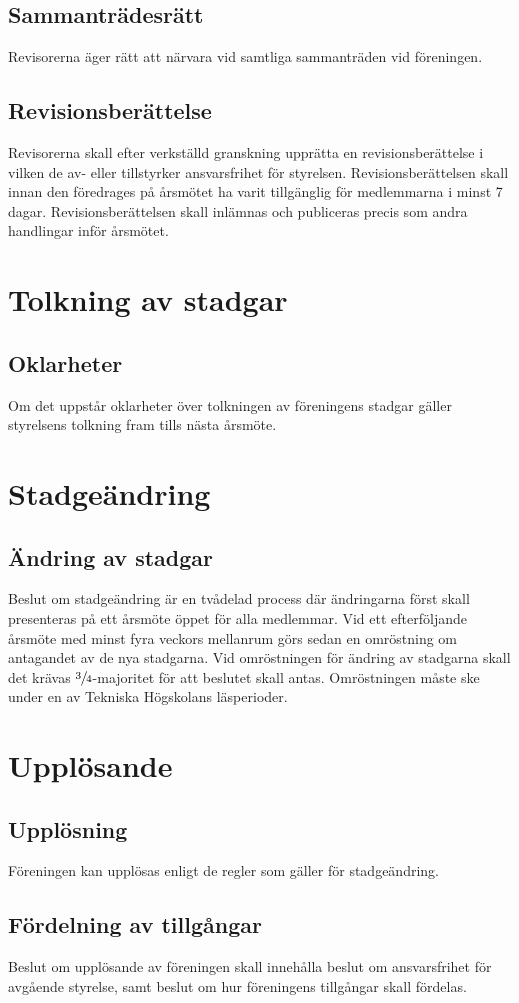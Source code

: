 \documentclass[11pt,a4paper]{article}
\begin{document}
\subsection{Sammanträdesrätt}
Revisorerna äger rätt att närvara vid samtliga sammanträden vid föreningen.
\subsection{Revisionsberättelse}
Revisorerna skall efter verkställd granskning upprätta en revisionsberättelse i vilken de av- eller tillstyrker ansvarsfrihet för styrelsen. Revisionsberättelsen skall innan den föredrages på årsmötet ha varit tillgänglig för medlemmarna i minst 7 dagar. Revisionsberättelsen skall inlämnas och publiceras precis som andra handlingar inför årsmötet.



\section{Tolkning av stadgar}

\subsection{Oklarheter}
Om det uppstår oklarheter över tolkningen av föreningens stadgar gäller styrelsens tolkning fram tills nästa årsmöte.



\section{Stadgeändring}

\subsection{Ändring av stadgar}
Beslut om stadgeändring är en tvådelad process där ändringarna först skall presenteras på ett årsmöte öppet för alla medlemmar. 
Vid ett efterföljande årsmöte med minst fyra veckors mellanrum görs sedan en omröstning om antagandet av de nya stadgarna. Vid omröstningen för ändring av stadgarna skall det krävas \(\sfrac{3}{4}\)-majoritet för att beslutet skall antas. Omröstningen måste ske under en av Tekniska Högskolans läsperioder.



\section{Upplösande}

\subsection{Upplösning}
Föreningen kan upplösas enligt de regler som gäller för stadgeändring.
\subsection{Fördelning av tillgångar}
Beslut om upplösande av föreningen skall innehålla beslut om ansvarsfrihet för avgående styrelse, samt beslut om hur föreningens tillgångar skall fördelas.
\end{document}
